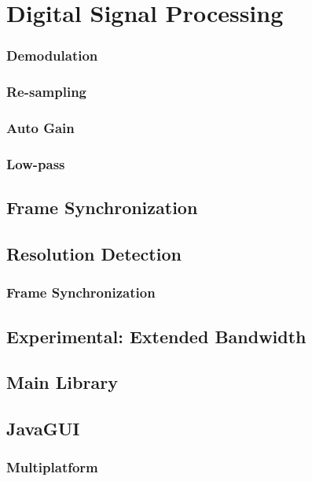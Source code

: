 \documentclass[a4paper,12pt,twoside,openright]{report}
\begin{document}
\section{Digital Signal Processing}

\subsubsection{Demodulation}

\subsubsection{Re-sampling}

\subsubsection{Auto Gain}

\subsubsection{Low-pass}

\subsection{Frame Synchronization}

\subsection{Resolution Detection}

\subsubsection{Frame Synchronization}

\subsection{Experimental: Extended Bandwidth}

\subsection{Main Library}

\subsection{JavaGUI}

\subsubsection{Multiplatform}
\end{document}
